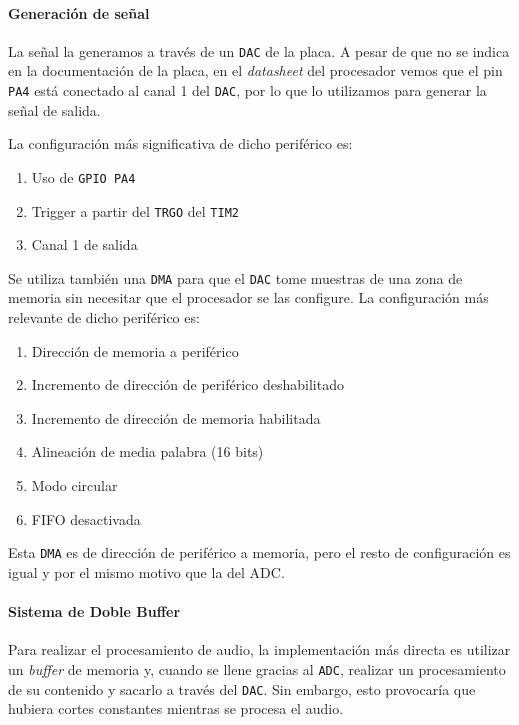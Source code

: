\paragraph{Generación de señal}

La señal la generamos a través de un \texttt{DAC} de la placa. A pesar de que no se indica en la documentación de la placa, en el \textit{datasheet} del procesador vemos que el pin \texttt{PA4} está conectado al canal 1 del \texttt{DAC}, por lo que lo utilizamos para generar la señal de salida.

La configuración más significativa de dicho periférico es:
\begin{enumerate}
    \item Uso de \texttt{GPIO PA4}
    \item Trigger a partir del \texttt{TRGO} del \texttt{TIM2}
    \item Canal 1 de salida
\end{enumerate}

Se utiliza también una \texttt{DMA} para que el \texttt{DAC} tome muestras de una zona de memoria sin necesitar que el procesador se las configure. La configuración más relevante de dicho periférico es:
\begin{enumerate}
    \item Dirección de memoria a periférico
    \item Incremento de dirección de periférico deshabilitado
    \item Incremento de dirección de memoria habilitada
    \item Alineación de media palabra (16 bits)
    \item Modo circular
    \item FIFO desactivada
\end{enumerate} 

Esta \texttt{DMA} es de dirección de periférico a memoria, pero el resto de configuración es igual y por el mismo motivo que la del ADC.

\paragraph{Sistema de Doble Buffer}

Para realizar el procesamiento de audio, la implementación más directa es utilizar un \textit{buffer} de memoria y, cuando se llene gracias al \texttt{ADC}, realizar un procesamiento de su contenido y sacarlo a través del \texttt{DAC}. Sin embargo, esto provocaría que hubiera cortes constantes mientras se procesa el audio.

